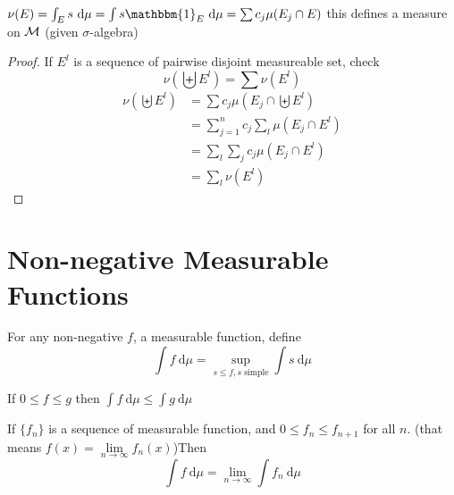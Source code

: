 \begin{lemma}\label{lem:measure-from-set}
  $\nu(E) = \int_E s \ \mathrm{d}\mu = \int s \mathbbm{1}_E\ \mathrm{d}\mu = \sum c_j \mu(E_j \cap E)$
  this defines a measure on $\mathcal M$ (given $\sigma$-algebra)
\end{lemma}

\begin{proof}
  If $E^l$ is a sequence of pairwise disjoint measureable set, check
  \[\nu\left(\biguplus E^l\right) = \sum \nu(E^l)\] 
  \begin{align*}
    \nu\left(\biguplus E^l\right) &= \sum c_j \mu(E_j \cap \biguplus E^l) \\
    &= \sum_{j=1}^n c_j \sum_l \mu(E_j \cap E^l) \\
    &= \sum_l \sum_j c_j \mu(E_j \cap E^l) \\
    &= \sum_l \nu(E^l)
  \end{align*}
\end{proof}

\section{Non-negative Measurable Functions}

\begin{definition}
  For any non-negative $f$, a measurable function, define
  \[\int f \ \mathrm{d}\mu = \sup_{s \le f, s \text{ simple}} \int s \ \mathrm{d}\mu\]
\end{definition}

\begin{remark}
  If $0 \le f \leq g$ then $\int f \ \mathrm{d}\mu \leq \int g \ \mathrm{d}\mu$
\end{remark}

\begin{theorem}
  If $\{f_n\}$ is a sequence of measurable function, and $0 \le f_n \le f_{n+1}$ for all $n$. 
  (that means $f(x) = \lim\limits_{n\to\infty}f_n(x)$)Then
  \[\int f\ \mathrm{d}\mu = \lim_{n\to\infty}\int f_n\ \mathrm{d}\mu\]
\end{theorem}

